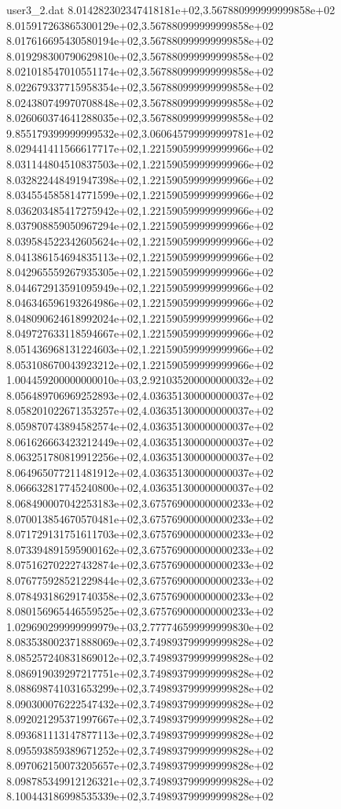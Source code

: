 \begin{filecontents}{user3_2.dat}
8.014282302347418181e+02,3.567880999999999858e+02
8.015917263865300129e+02,3.567880999999999858e+02
8.017616695430580194e+02,3.567880999999999858e+02
8.019298300790629810e+02,3.567880999999999858e+02
8.021018547010551174e+02,3.567880999999999858e+02
8.022679337715958354e+02,3.567880999999999858e+02
8.024380749970708848e+02,3.567880999999999858e+02
8.026060374641288035e+02,3.567880999999999858e+02
9.855179399999999532e+02,3.060645799999999781e+02
8.029441411566617717e+02,1.221590599999999966e+02
8.031144804510837503e+02,1.221590599999999966e+02
8.032822448491947398e+02,1.221590599999999966e+02
8.034554585814771599e+02,1.221590599999999966e+02
8.036203485417275942e+02,1.221590599999999966e+02
8.037908859050967294e+02,1.221590599999999966e+02
8.039584522342605624e+02,1.221590599999999966e+02
8.041386154694835113e+02,1.221590599999999966e+02
8.042965559267935305e+02,1.221590599999999966e+02
8.044672913591095949e+02,1.221590599999999966e+02
8.046346596193264986e+02,1.221590599999999966e+02
8.048090624618992024e+02,1.221590599999999966e+02
8.049727633118594667e+02,1.221590599999999966e+02
8.051436968131224603e+02,1.221590599999999966e+02
8.053108670043923212e+02,1.221590599999999966e+02
1.004459200000000010e+03,2.921035200000000032e+02
8.056489706969252893e+02,4.036351300000000037e+02
8.058201022671353257e+02,4.036351300000000037e+02
8.059870743894582574e+02,4.036351300000000037e+02
8.061626663423212449e+02,4.036351300000000037e+02
8.063251780819912256e+02,4.036351300000000037e+02
8.064965077211481912e+02,4.036351300000000037e+02
8.066632817745240800e+02,4.036351300000000037e+02
8.068490007042253183e+02,3.675769000000000233e+02
8.070013854670570481e+02,3.675769000000000233e+02
8.071729131751611703e+02,3.675769000000000233e+02
8.073394891595900162e+02,3.675769000000000233e+02
8.075162702227432874e+02,3.675769000000000233e+02
8.076775928521229844e+02,3.675769000000000233e+02
8.078493186291740358e+02,3.675769000000000233e+02
8.080156965446559525e+02,3.675769000000000233e+02
1.029690299999999979e+03,2.777746599999999830e+02
8.083538002371888069e+02,3.749893799999999828e+02
8.085257240831869012e+02,3.749893799999999828e+02
8.086919039297217751e+02,3.749893799999999828e+02
8.088698741031653299e+02,3.749893799999999828e+02
8.090300076222547432e+02,3.749893799999999828e+02
8.092021295371997667e+02,3.749893799999999828e+02
8.093681113147877113e+02,3.749893799999999828e+02
8.095593859389671252e+02,3.749893799999999828e+02
8.097062150073205657e+02,3.749893799999999828e+02
8.098785349912126321e+02,3.749893799999999828e+02
8.100443186998535339e+02,3.749893799999999828e+02

\end{filecontents}
